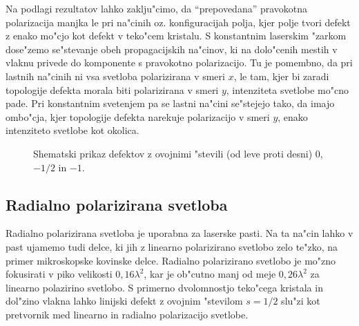 \documentclass[a4paper,10pt]{article}
\begin{document}
Na podlagi rezultatov lahko zaklju"cimo, da ``prepovedana'' pravokotna polarizacija manjka le pri na"cinih oz. konfiguracijah polja, kjer polje tvori defekt z enako mo"cjo kot defekt v teko"cem kristalu. 
S konstantnim laserskim "zarkom dose"zemo se"stevanje obeh propagacijskih na"cinov, ki na dolo"cenih mestih v vlaknu privede do komponente s pravokotno polarizacijo. 
Tu je pomembno, da pri lastnih na"cinih ni vsa svetloba polarizirana v smeri $x$, le tam, kjer bi zaradi topologije defekta morala biti polarizirana v smeri $y$, intenziteta svetlobe mo"cno pade. 
Pri konstantnim svetenjem pa se lastni na"cini se"stejejo tako, da imajo ombo"cja, kjer topologije defekta narekuje polarizacijo v smeri $y$, enako intenziteto svetlobe kot okolica. 

\begin{figure}[!htbp]
 \caption{Shematski prikaz defektov z ovojnimi "stevili (od leve proti desni) $0$, $-1/2$ in $-1$. }
\end{figure}

\subsection{Radialno polarizirana svetloba}
Radialno polarizirana svetloba je uporabna za laserske pasti. 
Na ta na"cin lahko v past ujamemo tudi delce, ki jih z linearno polarizirano svetlobo zelo te"zko, na primer mikroskopske kovinske delce\cite{radial-trap}.
Radialno polarizirano svetlobo je mo"zno fokusirati v piko velikosti $0,\!16\lambda^2$, kar je ob"cutno manj od meje $0,\!26\lambda^2$ za linearno polazirino svetlobo\cite{radial-focus}. 
S primerno dvolomnostjo teko"cega kristala in dol"zino vlakna lahko linijski defekt z ovojnim "stevilom $s=1/2$ slu"zi kot pretvornik med linearno in radialno polarizacijo svetlobe. 
\end{document}

